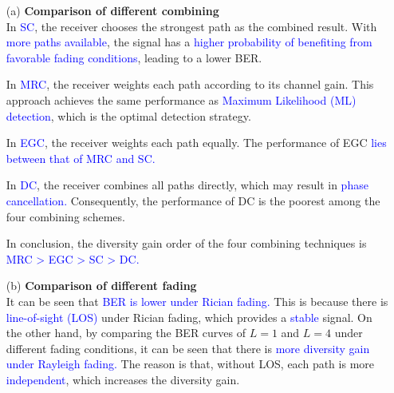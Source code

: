 \begin{itemize}
    \item[(a)] \textbf{Comparison of different combining} \hfill \\
    In \textcolor{blue}{SC}, the receiver chooses the strongest path as the combined result. With \textcolor{blue}{more paths available}, the signal has a \textcolor{blue}{higher probability of benefiting from favorable fading conditions}, leading to a lower BER. \hfill

    In \textcolor{blue}{MRC}, the receiver weights each path according to its channel gain. This approach achieves the same performance as \textcolor{blue}{Maximum Likelihood (ML) detection}, which is the optimal detection strategy. \hfill

    In \textcolor{blue}{EGC}, the receiver weights each path equally. The performance of EGC \textcolor{blue}{lies between that of MRC and SC.} \hfill

    In \textcolor{blue}{DC}, the receiver combines all paths directly, which may result in \textcolor{blue}{phase cancellation.} Consequently, the performance of DC is the poorest among the four combining schemes. \hfill

    In conclusion, the diversity gain order of the four combining techniques is \textcolor{blue}{MRC > EGC > SC > DC.}
    \item[(b)] \textbf{Comparison of different fading} \hfill \\
    It can be seen that \textcolor{blue}{BER is lower under Rician fading.} This is because there
is \textcolor{blue}{line-of-sight (LOS)} under Rician fading, which provides a \textcolor{blue}{stable} signal.
On the other hand, by comparing the BER curves of $L = 1$ and $L = 4$ under different fading conditions, it can be seen that there is
\textcolor{blue}{more diversity gain under Rayleigh fading.} The reason is that, without LOS, each
path is more \textcolor{blue}{independent}, which increases the diversity gain.
\end{itemize}